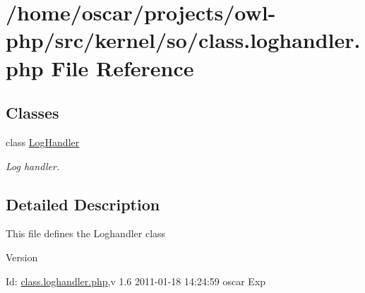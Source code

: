 \section{/home/oscar/projects/owl-\/php/src/kernel/so/class.loghandler.php File Reference}
\label{class_8loghandler_8php}
\subsection*{Classes}
\begin{DoxyCompactItemize}
\item 
class \hyperlink{classLogHandler}{LogHandler}
\begin{DoxyCompactList}\small\item\em Log handler. \item\end{DoxyCompactList}\end{DoxyCompactItemize}


\subsection{Detailed Description}
This file defines the Loghandler class \begin{DoxyVersion}{Version}

\end{DoxyVersion}
\begin{DoxyParagraph}{Id:}
\hyperlink{class_8loghandler_8php}{class.loghandler.php},v 1.6 2011-\/01-\/18 14:24:59 oscar Exp 
\end{DoxyParagraph}
